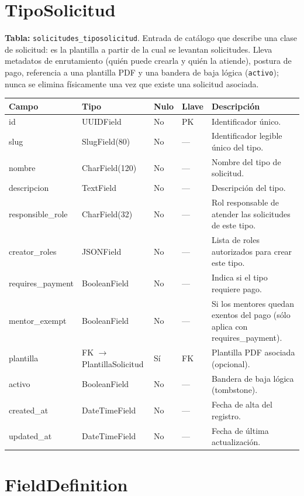 \documentclass[12pt,letterpaper]{report}
\begin{document}
\section{TipoSolicitud}

\textbf{Tabla:} \texttt{solicitudes\_tiposolicitud}. Entrada de catálogo que
describe una clase de solicitud: es la plantilla a partir de la cual se
levantan solicitudes. Lleva metadatos de enrutamiento (quién puede crearla y
quién la atiende), postura de pago, referencia a una plantilla PDF y una
bandera de baja lógica (\texttt{activo}); nunca se elimina físicamente una vez
que existe una solicitud asociada.

\begin{longtable}{L{2.9cm} L{2.6cm} C{1.0cm} C{1.0cm} L{6.6cm}}
\toprule
\textbf{Campo} & \textbf{Tipo} & \textbf{Nulo} & \textbf{Llave} & \textbf{Descripción} \\
\midrule
\endhead
id & UUIDField & No & PK & Identificador único. \\
slug & SlugField(80) & No & --- & Identificador legible único del tipo. \\
nombre & CharField(120) & No & --- & Nombre del tipo de solicitud. \\
descripcion & TextField & No & --- & Descripción del tipo. \\
responsible\_role & CharField(32) & No & --- & Rol responsable de atender las solicitudes de este tipo. \\
creator\_roles & JSONField & No & --- & Lista de roles autorizados para crear este tipo. \\
requires\_payment & BooleanField & No & --- & Indica si el tipo requiere pago. \\
mentor\_exempt & BooleanField & No & --- & Si los mentores quedan exentos del pago (sólo aplica con requires\_payment). \\
plantilla & FK $\rightarrow$ PlantillaSolicitud & Sí & FK & Plantilla PDF asociada (opcional). \\
activo & BooleanField & No & --- & Bandera de baja lógica (tombstone). \\
created\_at & DateTimeField & No & --- & Fecha de alta del registro. \\
updated\_at & DateTimeField & No & --- & Fecha de última actualización. \\
\bottomrule
\end{longtable}

\section{FieldDefinition}
\end{document}
